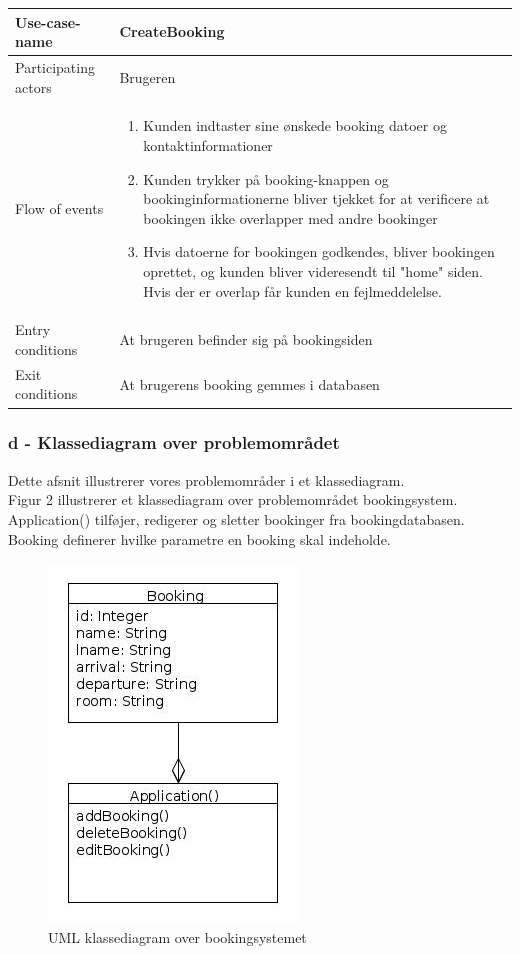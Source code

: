 \documentclass[12pt,a4paper]{article}
\begin{document}
\bigskip

\begin{minipage}{\textwidth}

 \label{tab:title}
\begin{tabular}{| p{5cm} p{10cm} |}
\hline Use-case-name & CreateBooking \\
\hline Participating actors & Brugeren \\
\hline Flow of events & \begin{enumerate}
\item Kunden indtaster sine ønskede booking datoer og kontaktinformationer 
\item Kunden trykker på booking-knappen og bookinginformationerne bliver tjekket for at verificere at bookingen ikke overlapper med andre bookinger
\item Hvis datoerne for bookingen godkendes, bliver bookingen oprettet, og kunden bliver videresendt til "home" siden. Hvis der er overlap får kunden en fejlmeddelelse.
\end{enumerate} \\
\hline Entry conditions & At brugeren befinder sig på bookingsiden \\
\hline Exit conditions & At brugerens booking gemmes i databasen  \\
\hline
\end{tabular}

\end{minipage}	
	
\subsubsection{d - Klassediagram over problemområdet}
Dette afsnit illustrerer vores problemområder i et klassediagram.\\
Figur 2 illustrerer et klassediagram over problemområdet  bookingsystem. Application() tilføjer, redigerer og sletter bookinger fra bookingdatabasen. Booking definerer hvilke parametre en booking skal indeholde.
\begin{figure}[H]
\centering
\includegraphics[scale=0.6]{BookingSystem.jpg}
\caption{UML klassediagram over bookingsystemet}
\end{figure}
\end{document}
